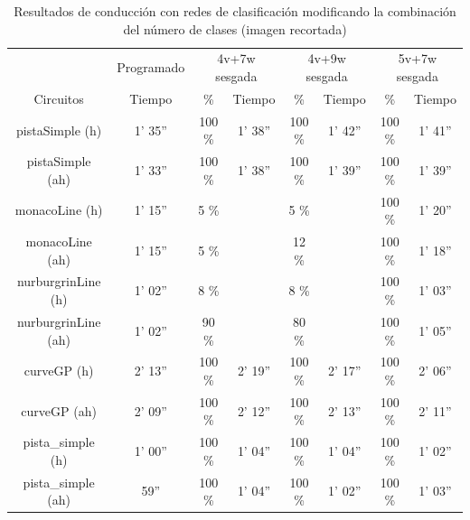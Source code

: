 \begin{table}[H]
\centering
\caption{Resultados de conducción con redes de clasificación modificando la combinación del número de clases (imagen recortada)}
\label{resultados_classificacion_recortada}
\resizebox{16cm}{!} {
\begin{tabular}{c|c|c|c|c|c|c|c|}
\cline{2-8}
                          & \multicolumn{1}{c|}{Programado} & \multicolumn{2}{c|}{4v+7w sesgada} & \multicolumn{2}{c|}{4v+9w sesgada} & \multicolumn{2}{c|}{5v+7w sesgada} \\ \cline{1-8} 
                        \multicolumn{1}{|c|}{Circuitos}    & Tiempo       & \%       & Tiempo       & \%        & Tiempo       & \%      & Tiempo     \\ \hline
\multicolumn{1}{|c|}{pistaSimple (h)}    & 1' 35''           & 100 \%         & 1' 38''           & 100 \%          & 1' 42''           & 100 \%       & 1' 41''      \\ \hline
\multicolumn{1}{|c|}{pistaSimple (ah)}     & 1' 33''           & 100 \%          & 1' 38''            & 100 \%           & 1' 39''           & 100 \%       & 1' 39''       \\ \hline
\multicolumn{1}{|c|}{monacoLine (h)}      & 1' 15''           & 5 \%           &             & 5 \%       &             & 100 \%       & 1' 20''         \\ \hline
\multicolumn{1}{|c|}{monacoLine (ah)}       & 1' 15''            & 5 \%       &             & 12 \%           &             & 100 \%          & 1' 18''      \\ \hline
\multicolumn{1}{|c|}{nurburgrinLine (h)}      & 1' 02''            & 8 \%          &            & 8 \%        &           & 100 \%       &  1' 03''    \\ \hline
\multicolumn{1}{|c|}{nurburgrinLine (ah)}       & 1' 02''           & 90 \%           &           & 80 \%        &            & 100 \%       & 1' 05''       \\ \hline
\multicolumn{1}{|c|}{curveGP (h)}     & 2' 13''           & 100 \%           & 2' 19''            & 100 \%        & 2' 17''           & 100 \%       & 2' 06''      \\ \hline
\multicolumn{1}{|c|}{curveGP (ah)}       & 2' 09''            & 100 \%         & 2' 12''            & 100 \%        & 2' 13''          & 100 \%      & 2' 11''     \\ \hline
\multicolumn{1}{|c|}{pista\_simple (h)}       & 1' 00''           & 100 \%          & 1' 04''            & 100 \%        & 1' 04''             & 100 \%      & 1' 02''       \\ \hline
\multicolumn{1}{|c|}{pista\_simple (ah)}     & 59''            & 100 \%          & 1' 04''          & 100 \%        & 1' 02''             & 100 \%      & 1' 03''        \\ \hline
\end{tabular}
}
\end{table}



